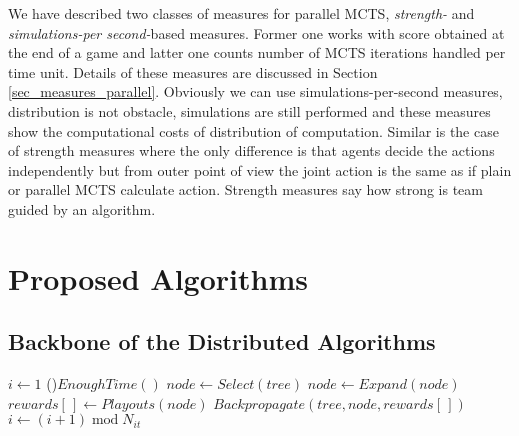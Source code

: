 We have described two classes of measures for parallel MCTS, \emph{strength-} and
\emph{simulations-per second-}based measures. Former one works with score obtained at the end
of a game and latter one counts number of MCTS iterations handled per time unit. Details of
these measures are discussed in Section \ref{sec_measures_parallel}. Obviously we can use
simulations-per-second measures, distribution is not obstacle, simulations are still performed
and these measures show the computational costs of distribution of computation. Similar is the
case of strength measures where the only difference is that agents decide the actions
independently but from outer point of view the joint action is the same as if plain or parallel
MCTS calculate action. Strength measures say how strong is team guided by an algorithm.



\section{Proposed Algorithms}



\subsection{Backbone of the Distributed Algorithms}
\label{sec_dmcts_common}

\begin{algorithm}
\DontPrintSemicolon
\caption{$DistributedMCTSLoop(tree)$\label{alg_dmcts_common}}
$i \leftarrow 1$\;
\While(){$EnoughTime()$}{
    $node \leftarrow Select(tree)$ \;
    $node \leftarrow Expand(node)$ \;
    $rewards[\,] \leftarrow Playouts(node)$ \;
    $Backpropagate(tree,node,rewards[\,])$ \;
    $i \leftarrow (i + 1)\;\mathrm{mod}\;N_{it}$\;
}
 \;
\end{algorithm}

